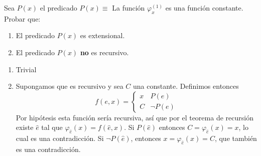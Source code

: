 \documentclass[twoside]{article}
\begin{document}
\begin{ejercicio}{5}
Sea $P(x)$ el predicado $P(x) \equiv$ La función $\varphi^{(1)}_x$ es una función constante. Probar
que:
\begin{enumerate}
\item El predicado $P(x)$ es extensional.
\item El predicado $P(x)$ \textbf{no} es recursivo.
\end{enumerate}
\end{ejercicio}
\begin{solucion}
\begin{enumerate}
\item Trivial
\item Supongamos que es recursivo y sea $C$ una constante. Definimos entonces
\[
f(e,x)=\begin{cases}
x & P(e)\\
C & \neg P(e)
\end{cases}
\]
Por hipótesis esta función sería recursiva, así que por el teorema de recursión existe $\hat{e}$ tal que $\varphi_{\hat{e}}(x)=f(\hat{e},x)$. Si $P(\hat{e})$ entonces $C=\varphi_{\hat{e}}(x)=x$, lo cual es una contradicción. Si $\neg P(\hat{e})$, entonces $x=\varphi_{\hat{e}}(x)=C$, que también es una contradicción.
\end{enumerate}
\end{solucion}

\newpage
\end{document}
